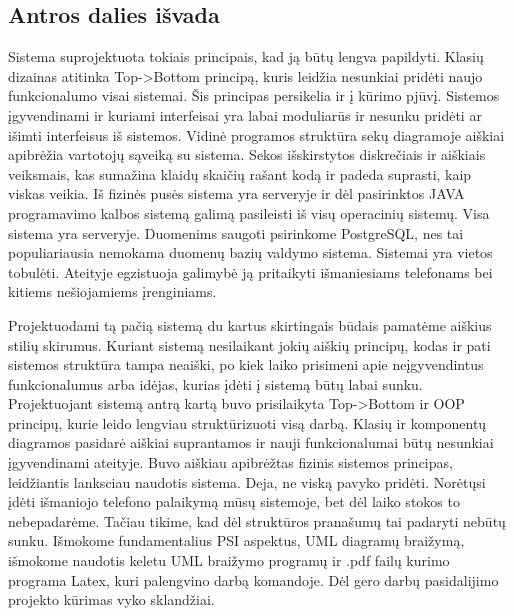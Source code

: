 \documentclass[oneside]{VUMIFPSkursinis}
\begin{document}
\pagebreak
\subsection{Antros dalies išvada}
Sistema suprojektuota tokiais principais, kad ją būtų lengva papildyti. Klasių dizainas atitinka Top->Bottom principą, kuris leidžia nesunkiai pridėti naujo funkcionalumo visai sistemai. Šis principas persikelia ir į kūrimo pjūvį. Sistemos įgyvendinami ir kuriami interfeisai yra labai moduliarūs ir nesunku pridėti ar išimti interfeisus iš sistemos. Vidinė programos struktūra sekų diagramoje aiškiai apibrėžia vartotojų sąveiką su sistema. Sekos išskirstytos diskrečiais ir aiškiais veiksmais, kas sumažina klaidų skaičių rašant kodą ir padeda suprasti, kaip viskas veikia. Iš fizinės pusės sistema yra serveryje ir dėl pasirinktos JAVA programavimo kalbos sistemą galimą pasileisti iš visų operacinių sistemų. Visa sistema yra serveryje. Duomenims saugoti psirinkome PostgreSQL, nes tai populiariausia nemokama duomenų bazių valdymo sistema. Sistemai yra vietos tobulėti. Ateityje egzistuoja galimybė ją pritaikyti išmaniesiams telefonams bei kitiems nešiojamiems įrenginiams.



Projektuodami tą pačią sistemą du kartus skirtingais būdais pamatėme aiškius stilių skirumus. Kuriant sistemą nesilaikant jokių aiškių principų, kodas ir pati sistemos struktūra tampa neaiški, po kiek laiko prisimeni apie neįgyvendintus funkcionalumus arba idėjas, kurias įdėti į sistemą būtų labai sunku. Projektuojant sistemą antrą kartą buvo prisilaikyta Top->Bottom ir OOP principų, kurie leido lengviau struktūrizuoti visą darbą. Klasių ir komponentų diagramos pasidarė aiškiai suprantamos ir nauji funkcionalumai būtų nesunkiai įgyvendinami ateityje. Buvo aiškiau apibrėžtas fizinis sistemos principas, leidžiantis lanksciau naudotis sistema. Deja, ne viską pavyko pridėti. Norėtųsi įdėti išmaniojo telefono palaikymą mūsų sistemoje, bet dėl laiko stokos to nebepadarėme. Tačiau tikime, kad dėl struktūros pranašumų tai padaryti nebūtų sunku. Išmokome fundamentalius PSI aspektus, UML diagramų braižymą, išmokome naudotis keletu UML braižymo programų ir .pdf failų kurimo programa Latex, kuri palengvino darbą komandoje. Dėl gero darbų pasidalijimo projekto kūrimas vyko sklandžiai. 
\end{document}
